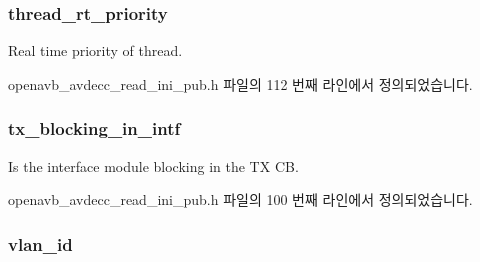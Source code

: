 \subsubsection[{\texorpdfstring{thread\+\_\+rt\+\_\+priority}{thread_rt_priority}}]{ thread\+\_\+rt\+\_\+priority}\hypertarget{structopenavb__tl__data__cfg_a55a9e2a7773c0ac79fecc40b5623a9b8}{}\label{structopenavb__tl__data__cfg_a55a9e2a7773c0ac79fecc40b5623a9b8}


Real time priority of thread. 



openavb\+\_\+avdecc\+\_\+read\+\_\+ini\+\_\+pub.\+h 파일의 112 번째 라인에서 정의되었습니다.

\subsubsection[{\texorpdfstring{tx\+\_\+blocking\+\_\+in\+\_\+intf}{tx_blocking_in_intf}}]{ tx\+\_\+blocking\+\_\+in\+\_\+intf}\hypertarget{structopenavb__tl__data__cfg_aeb3581dc6183af28e4c61830959f6c86}{}\label{structopenavb__tl__data__cfg_aeb3581dc6183af28e4c61830959f6c86}


Is the interface module blocking in the TX CB. 



openavb\+\_\+avdecc\+\_\+read\+\_\+ini\+\_\+pub.\+h 파일의 100 번째 라인에서 정의되었습니다.

\subsubsection[{\texorpdfstring{vlan\+\_\+id}{vlan_id}}]{ vlan\+\_\+id}\hypertarget{structopenavb__tl__data__cfg_a1b24465e054a200402c04340ccc56eae}{}\label{structopenavb__tl__data__cfg_a1b24465e054a200402c04340ccc56eae}


